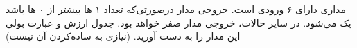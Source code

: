 مداری دارای ۶ ورودی است. خروجی مدار درصورتی‌که تعداد ۱ ها بیشتر از ۰ ها باشد یک می‌شود. در سایر حالات، خروجی مدار صفر خواهد بود. جدول ارزش و عبارت بولی این مدار را به دست آورید. (نیازی به ساده‌کردن آن نیست)

